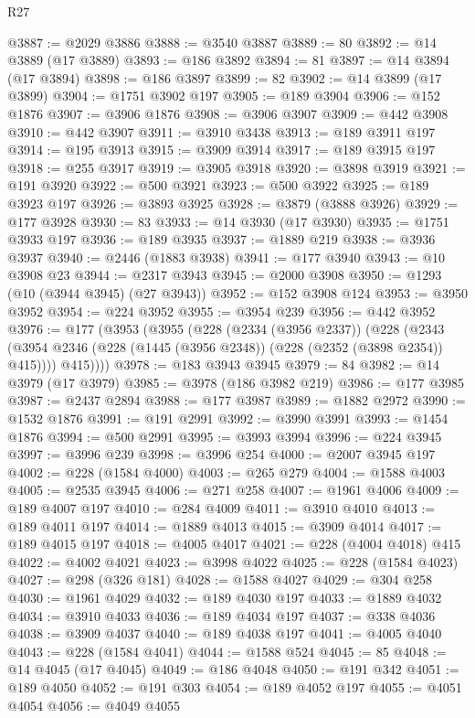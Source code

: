 \begin{lexlean}{R27}
\begin{coremodule}
@3887 := @2029 @3886
@3888 := @3540 @3887
@3889 := 80
@3892 := @14 @3889 (@17 @3889)
@3893 := @186 @3892
@3894 := 81
@3897 := @14 @3894 (@17 @3894)
@3898 := @186 @3897
@3899 := 82
@3902 := @14 @3899 (@17 @3899)
@3904 := @1751 @3902 @197
@3905 := @189 @3904
@3906 := @152 @1876
@3907 := @3906 @1876
@3908 := @3906 @3907
@3909 := @442 @3908
@3910 := @442 @3907
@3911 := @3910 @3438
@3913 := @189 @3911 @197
@3914 := @195 @3913
@3915 := @3909 @3914
@3917 := @189 @3915 @197
@3918 := @255 @3917
@3919 := @3905 @3918
@3920 := @3898 @3919
@3921 := @191 @3920
@3922 := @500 @3921
@3923 := @500 @3922
@3925 := @189 @3923 @197
@3926 := @3893 @3925
@3928 := @3879 (@3888 @3926)
@3929 := @177 @3928
@3930 := 83
@3933 := @14 @3930 (@17 @3930)
@3935 := @1751 @3933 @197
@3936 := @189 @3935
@3937 := @1889 @219
@3938 := @3936 @3937
@3940 := @2446 (@1883 @3938)
@3941 := @177 @3940
@3943 := @10 @3908 @23
@3944 := @2317 @3943
@3945 := @2000 @3908
@3950 := @1293 (@10 (@3944 @3945) (@27 @3943))
@3952 := @152 @3908 @124
@3953 := @3950 @3952
@3954 := @224 @3952
@3955 := @3954 @239
@3956 := @442 @3952
@3976 := @177
    (@3953
      (@3955
        (@228
          (@2334 (@3956 @2337))
          (@228
            (@2343 (@3954 @2346 (@228 (@1445 (@3956 @2348)) (@228 (@2352 (@3898 @2354)) @415))))
            @415))))
@3978 := @183 @3943 @3945
@3979 := 84
@3982 := @14 @3979 (@17 @3979)
@3985 := @3978 (@186 @3982 @219)
@3986 := @177 @3985
@3987 := @2437 @2894
@3988 := @177 @3987
@3989 := @1882 @2972
@3990 := @1532 @1876
@3991 := @191 @2991
@3992 := @3990 @3991
@3993 := @1454 @1876
@3994 := @500 @2991
@3995 := @3993 @3994
@3996 := @224 @3945
@3997 := @3996 @239
@3998 := @3996 @254
@4000 := @2007 @3945 @197
@4002 := @228 (@1584 @4000)
@4003 := @265 @279
@4004 := @1588 @4003
@4005 := @2535 @3945
@4006 := @271 @258
@4007 := @1961 @4006
@4009 := @189 @4007 @197
@4010 := @284 @4009
@4011 := @3910 @4010
@4013 := @189 @4011 @197
@4014 := @1889 @4013
@4015 := @3909 @4014
@4017 := @189 @4015 @197
@4018 := @4005 @4017
@4021 := @228 (@4004 @4018) @415
@4022 := @4002 @4021
@4023 := @3998 @4022
@4025 := @228 (@1584 @4023)
@4027 := @298 (@326 @181)
@4028 := @1588 @4027
@4029 := @304 @258
@4030 := @1961 @4029
@4032 := @189 @4030 @197
@4033 := @1889 @4032
@4034 := @3910 @4033
@4036 := @189 @4034 @197
@4037 := @338 @4036
@4038 := @3909 @4037
@4040 := @189 @4038 @197
@4041 := @4005 @4040
@4043 := @228 (@1584 @4041)
@4044 := @1588 @524
@4045 := 85
@4048 := @14 @4045 (@17 @4045)
@4049 := @186 @4048
@4050 := @191 @342
@4051 := @189 @4050
@4052 := @191 @303
@4054 := @189 @4052 @197
@4055 := @4051 @4054
@4056 := @4049 @4055

\end{coremodule}
\end{lexlean}
